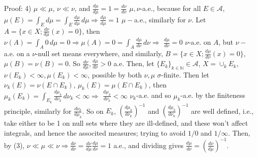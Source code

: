 \documentclass[12pt]{article}
\newcommand{\nats}[0] { \mathbb{N}}
\newcommand{\A}[0] { \mathcal{A} }
\newcommand{\rimply}[0] { \Rightarrow }
\begin{document}
\noindent
Proof: 4) $\mu \ll \mu$, $\nu \ll \nu$, and $\frac{d\mu}{d\mu} = 1 = \frac{d\nu}{d\nu}$ $\mu,\nu$-a.e., because for all $E \in \A$, $\mu(E) = \int_E d\mu = \int_E \frac{d\mu}{d\mu} \, d\mu \rimply \frac{d\mu}{d\mu} = 1$ $\mu-$a.e., similarly for $\nu$.  Let $A = \{ x \in X; \frac{d\nu}{d\mu} (x) = 0 \}$, then $\nu(A) = \int_A 0 \, d\mu = 0 \rimply \mu(A) = 0 = \int_A \frac{d\mu}{d\nu} \, d\nu \rimply$ $ \frac{d\mu}{d\nu} = 0$ $\nu$-a.e. on $A$, but $\nu-$a.e. on a $\nu$-null set means everywhere, and similarly, $B = \{ x \in X; \frac{d\mu}{d\nu} (x) = 0 \}$, $\mu(B) = \nu(B) = 0$. So $\frac{d\nu}{d\mu}, \frac{d\mu}{d\nu} > 0$ a.e. Then, let $\{E_k \}_{k \in \nats} \in \A$, $X = \cup_k E_k$, $\nu(E_k) < \infty, \mu(E_k) < \infty$, possible by both $\nu, \mu$ $\sigma$-finite. Then let $\nu_k(E) = \nu(E \cap E_k)$, $\mu_k(E) = \mu(E \cap E_k)$, then $\mu_k(E_k) = \int_{E_k} \frac{d\mu_k}{d\nu_k} \, d\nu_k < \infty \rimply$ $\frac{d\mu_k}{d\nu_k} < \infty$ $\nu_k$-a.e. and so $\mu_k$-a.e. by the finiteness principle, similarly for $\frac{d\nu_k}{d\mu_k}$. So on $E_k$, $\left( \frac{d\mu_k}{d\nu_k} \right) ^{-1}$ and $\left( \frac{d\mu_k}{d\nu_k} \right) ^{-1}$ are well defined, i.e., take either to be 1 on null sets where they are ill-defined, and these won't affect integrals, and hence the associted measures; trying to avoid $1/0$ and $1/\infty$. Then, by (3), $ \nu \ll \mu \ll \nu \rimply \frac{d\nu}{d\nu}= \frac{d\nu}{d\mu}\frac{d\mu}{d\nu} = 1$ a.e., and dividing gives $\frac{d\mu}{d\nu} = \left( \frac{d\nu}{d\mu} \right)^{-1}$.
\end{document}
